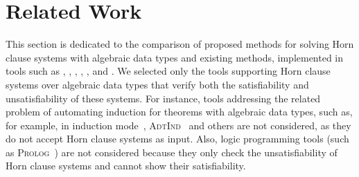 \section{Related Work}\label{ch:relatedWork}

This section is dedicated to the comparison of proposed methods for solving Horn clause systems with algebraic data types and existing methods, implemented in tools such as \spacer{}, \racer{}, \eldarica{}, \vericat{}, \hoice{}, and \rchc{}. We selected only the tools supporting Horn clause systems over algebraic data types that verify both the satisfiability and unsatisfiability of these systems. For instance, tools addressing the related problem of automating induction for theorems with algebraic data types, such as, for example, \cvc{} in induction mode~\cite{reynolds2015induction}, \textsc{AdtInd}~\cite{10.1007/978-3-030-30048-7_35} and others are not considered, as they do not accept Horn clause systems as input. Also, logic programming tools (such as \textsc{Prolog}~\cite{ClocksinMellish03}) are not considered because they only check the unsatisfiability of Horn clause systems and cannot show their satisfiability.

